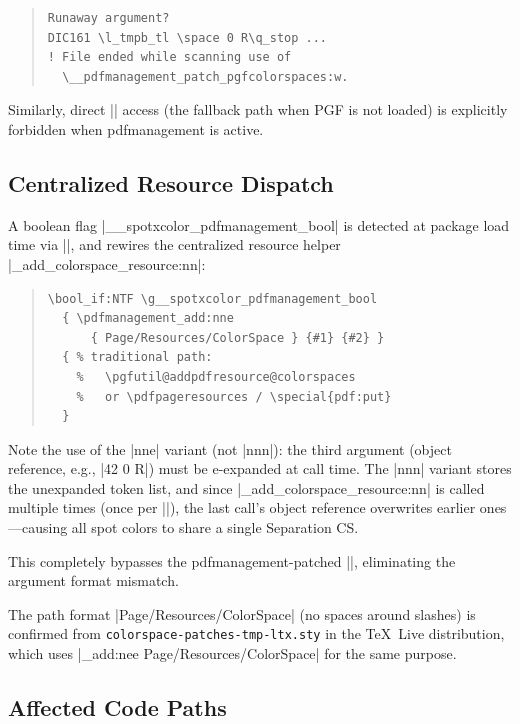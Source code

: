 \documentclass[luatex]{article}
\begin{document}
\begin{quote}
\begin{verbatim}
Runaway argument?
DIC161 \l_tmpb_tl \space 0 R\q_stop ...
! File ended while scanning use of
  \__pdfmanagement_patch_pgfcolorspaces:w.
\end{verbatim}
\end{quote}

Similarly, direct |\pdfpageresources| access (the fallback path when PGF is not loaded) is explicitly forbidden when pdfmanagement is active.

\subsection{Centralized Resource Dispatch}

A boolean flag |\g__spotxcolor_pdfmanagement_bool| is detected at package load time via |\IfPDFManagementActiveTF|, and rewires the centralized resource helper |\spotxcolor_add_colorspace_resource:nn|:

\begin{quote}
\begin{verbatim}
\bool_if:NTF \g__spotxcolor_pdfmanagement_bool
  { \pdfmanagement_add:nne
      { Page/Resources/ColorSpace } {#1} {#2} }
  { % traditional path:
    %   \pgfutil@addpdfresource@colorspaces
    %   or \pdfpageresources / \special{pdf:put}
  }
\end{verbatim}
\end{quote}

Note the use of the |nne| variant (not |nnn|): the third argument (object reference, e.g., |42 0 R|) must be e-expanded at call time.
The |nnn| variant stores the unexpanded token list, and since |\spotxcolor_add_colorspace_resource:nn| is called multiple times (once per ||), the last call's object reference overwrites earlier ones---causing all spot colors to share a single Separation CS.

This completely bypasses the pdfmanagement-patched |\pgfutil@addpdfresource@colorspaces|, eliminating the argument format mismatch.

The path format |Page/Resources/ColorSpace| (no spaces around slashes) is confirmed from \texttt{colorspace-patches-tmp-ltx.sty} in the \TeX\ Live distribution, which uses |\pdfmanagement_add:nee {Page/Resources/ColorSpace}| for the same purpose.

\subsection{Affected Code Paths}
\end{document}
